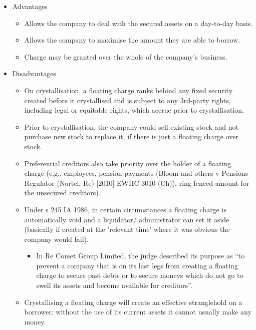 \documentclass[
]{article}
\providecommand{\tightlist}{%
  \setlength{\itemsep}{0pt}\setlength{\parskip}{0pt}}
\begin{document}
\begin{itemize}
\tightlist
\item
  Advantages

  \begin{itemize}
  \tightlist
  \item
    Allows the company to deal with the secured assets on a day-to-day
    basis.
  \item
    Allows the company to maximise the amount they are able to borrow.
  \item
    Charge may be granted over the whole of the company's business.
  \end{itemize}
\item
  Disadvantages

  \begin{itemize}
  \tightlist
  \item
    On crystallisation, a floating charge ranks behind any fixed
    security created before it crystallised and is subject to any
    3rd-party rights, including legal or equitable rights, which accrue
    prior to crystallisation.
  \item
    Prior to crystallisation, the company could sell existing stock and
    not purchase new stock to replace it, if there is just a floating
    charge over stock.
  \item
    Preferential creditors also take priority over the holder of a
    floating charge (e.g., employees, pension payments (Bloom and others
    v Pensions Regulator (Nortel, Re) {[}2010{]} EWHC 3010 (Ch)),
    ring-fenced amount for the unsecured creditors).
  \item
    Under s 245 IA 1986, in certain circumstances a floating charge is
    automatically void and a liquidator/ administrator can set it aside
    (basically if created at the 'relevant time' where it was obvious
    the company would fail).

    \begin{itemize}
    \tightlist
    \item
      In Re Comet Group Limited, the judge described its purpose as ``to
      prevent a company that is on its last legs from creating a
      floating charge to secure past debts or to secure moneys which do
      not go to swell its assets and become available for creditors''.
    \end{itemize}
  \item
    Crystallising a floating charge will create an effective
    stranglehold on a borrower: without the use of its current assets it
    cannot usually make any money.
  \end{itemize}
\end{itemize}
\end{document}
